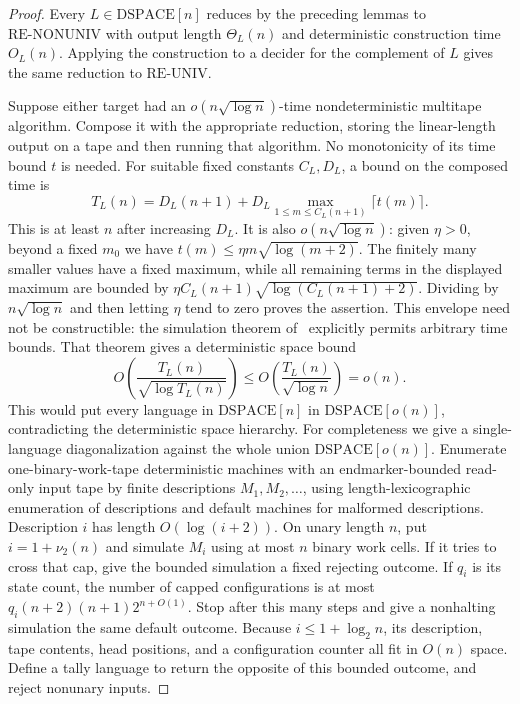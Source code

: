 \documentclass[11pt]{article}
\theoremstyle{definition}
\theoremstyle{remark}
\begin{document}
\begin{proof}
Every $L\in\mathrm{DSPACE}[n]$ reduces by the preceding lemmas to
$\mathrm{RE\mbox{-}NONUNIV}$ with output length $\Theta_L(n)$ and
deterministic construction time $O_L(n)$. Applying the construction to
a decider for the complement of $L$ gives the same reduction to
$\mathrm{RE\mbox{-}UNIV}$.

Suppose either target had an $o(n\sqrt{\log n})$-time nondeterministic
multitape algorithm. Compose it with the appropriate reduction, storing
the linear-length output on a tape and then running that algorithm.
No monotonicity of its time bound $t$ is needed.  For suitable fixed
constants $C_L,D_L$, a bound on the composed time is
\[
 T_L(n)=D_L(n+1)+D_L\max_{1\le m\le C_L(n+1)}\lceil t(m)\rceil.
\]
This is at least $n$ after increasing $D_L$.
It is also $o(n\sqrt{\log n})$: given $\eta>0$, beyond a fixed
$m_0$ we have $t(m)\le\eta m\sqrt{\log(m+2)}$.
The finitely many smaller values have a fixed maximum, while all
remaining terms in the displayed maximum are bounded by
$\eta C_L(n+1)\sqrt{\log(C_L(n+1)+2)}$.
Dividing by $n\sqrt{\log n}$ and then letting $\eta$ tend to zero
proves the assertion.  This envelope need not be constructible:
the simulation theorem of~\cite{Cruz26} explicitly permits arbitrary
time bounds. That theorem gives a deterministic space bound
\[
 O\!\left(\frac{T_L(n)}{\sqrt{\log T_L(n)}}\right)
 \leq O\!\left(\frac{T_L(n)}{\sqrt{\log n}}\right)=o(n).
\]
This would put every language in $\mathrm{DSPACE}[n]$ in
$\mathrm{DSPACE}[o(n)]$, contradicting the deterministic space hierarchy.
For completeness we give a single-language diagonalization against the
whole union $\mathrm{DSPACE}[o(n)]$. Enumerate one-binary-work-tape deterministic machines with
an endmarker-bounded read-only input tape by finite descriptions
$M_1,M_2,\ldots$, using length-lexicographic enumeration of descriptions
and default machines for malformed descriptions. Description $i$ has
length $O(\log(i+2))$. On unary length $n$, put $i=1+\nu_2(n)$ and
simulate $M_i$ using at most $n$ binary work cells. If it tries to
cross that cap, give the bounded simulation a fixed rejecting outcome.
If $q_i$ is its state count, the number of capped configurations is
at most $q_i(n+2)(n+1)2^{n+O(1)}$. Stop after this many steps and
give a nonhalting simulation the same default outcome. Because
$i\le1+\log_2n$, its description, tape contents, head positions,
and a configuration counter all fit in $O(n)$ space. Define a tally
language to return the opposite of this bounded outcome, and reject
nonunary inputs.


\end{proof}
\end{document}
